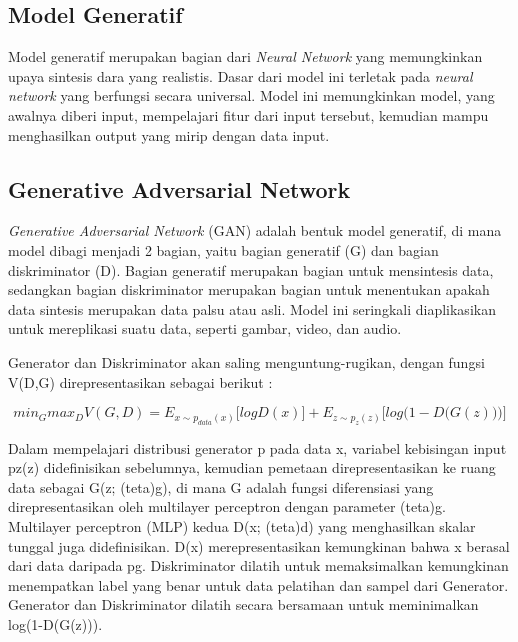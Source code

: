 \subsection{Model Generatif}
\label{subsec:modelGeneratif}

Model generatif merupakan bagian dari \emph{Neural Network} yang memungkinkan upaya sintesis dara yang realistis. 
Dasar dari model ini terletak pada \emph{neural network} yang berfungsi secara universal. 
Model ini memungkinkan model, yang awalnya diberi input, mempelajari fitur dari input tersebut, kemudian mampu menghasilkan output yang mirip dengan data input.

\subsection{Generative Adversarial Network}
\label{subsec:generativeAdversarialNetwork}

\emph{Generative Adversarial Network} (GAN) adalah bentuk model generatif, di mana model dibagi menjadi 2 bagian, yaitu bagian generatif (G) dan bagian diskriminator (D). 
Bagian generatif merupakan bagian untuk mensintesis data, sedangkan bagian diskriminator merupakan bagian untuk menentukan apakah data sintesis merupakan data palsu atau asli. 
Model ini seringkali diaplikasikan untuk mereplikasi suatu data, seperti gambar, video, dan audio.

Generator dan Diskriminator akan saling menguntung-rugikan, dengan fungsi V(D,G) direpresentasikan sebagai berikut : 

\begin{equation}
  \label{eq:GAN}
  min_{G} max_{D} V(G,D) =  E_{x \sim p_{data} (x)} \big[ log D(x) \big] + E_{z \sim p_{z} (z)} \big[ log  \big(1-D \big(G(z)\big) \big) \big]
\end{equation}

Dalam mempelajari distribusi generator p pada data x, variabel kebisingan input pz(z) didefinisikan sebelumnya, kemudian pemetaan direpresentasikan ke ruang data sebagai G(z; (teta)g), di mana G adalah fungsi diferensiasi yang direpresentasikan oleh multilayer perceptron dengan parameter (teta)g. 
Multilayer perceptron (MLP) kedua D(x; (teta)d) yang menghasilkan skalar tunggal juga didefinisikan. 
D(x) merepresentasikan kemungkinan bahwa x berasal dari data daripada pg. 
Diskriminator dilatih untuk memaksimalkan kemungkinan menempatkan label yang benar untuk data pelatihan dan sampel dari Generator. 
Generator dan  Diskriminator dilatih secara bersamaan untuk meminimalkan log(1-D(G(z))). \parencite{GAN}

